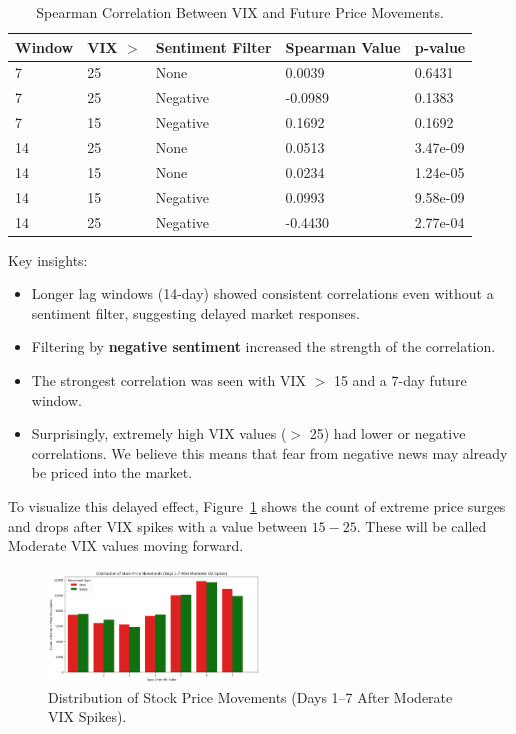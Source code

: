 \documentclass[twocolumn]{article}
\begin{document}
\begin{table}[h!]
\centering
\small
\begin{tabular}{|p{1.3cm}|p{0.8cm}|p{1.5cm}|p{1.5cm}|p{1.3cm}|}
\hline
\textbf{Window} & \textbf{VIX $>$} & \textbf{Sentiment Filter} & \textbf{Spearman Value} & \textbf{p-value} \\
\hline
7  & 25 & None         & 0.0039     & 0.6431 \\
7  & 25 & Negative     & -0.0989     & 0.1383  \\
7  & 15 & Negative     & 0.1692     & 0.1692   \\
14 & 25 & None         & 0.0513     & 3.47e-09   \\
14 & 15 & None         & 0.0234     & 1.24e-05   \\
14 & 15 & Negative     & 0.0993     & 9.58e-09   \\
14 & 25 & Negative     & -0.4430     & 2.77e-04  \\
\hline
\end{tabular}
\caption{Spearman Correlation Between VIX and Future Price Movements.}
\label{tab:vix_spearman}
\end{table}

Key insights:
\begin{itemize}
    \item Longer lag windows (14-day) showed consistent correlations even without a sentiment filter, suggesting delayed market responses.
    \item Filtering by \textbf{negative sentiment} increased the strength of the correlation.
    \item The strongest correlation was seen with VIX $>$ 15 and a 7-day future window.
    \item Surprisingly, extremely high VIX values ($>$ 25) had lower or negative correlations. We believe this means that fear from negative news may already be priced into the market.
\end{itemize}

To visualize this delayed effect, Figure~\ref{fig:vix-lag-impact} shows the count of extreme price surges and drops after VIX spikes with a value between $15-25$. These will be called Moderate VIX values moving forward.

\begin{figure}[h!]
    \centering
    \includegraphics[width=0.5\textwidth]{VIX_correlation_bar_graphs.png}
    \caption{Distribution of Stock Price Movements (Days 1--7 After Moderate VIX Spikes).}
    \label{fig:vix-lag-impact}
\end{figure}
\end{document}
